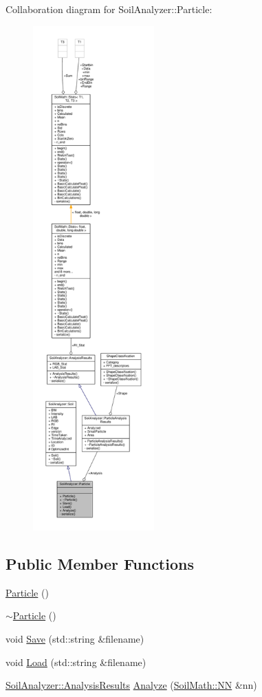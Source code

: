 Collaboration diagram for Soil\+Analyzer\+:\+:Particle\+:\nopagebreak
\begin{figure}[H]
\begin{center}
\leavevmode
\includegraphics[height=550pt]{class_soil_analyzer_1_1_particle__coll__graph}
\end{center}
\end{figure}
\subsection*{Public Member Functions}
\begin{DoxyCompactItemize}
\item 
\hyperlink{class_soil_analyzer_1_1_particle_ac01adbc5a4a30350985c0076da52e7da}{Particle} ()
\item 
\hyperlink{class_soil_analyzer_1_1_particle_ad2a5896d3ddf67275db18971bf43fbfe}{$\sim$\+Particle} ()
\item 
void \hyperlink{class_soil_analyzer_1_1_particle_acf374749108de7599ffca9e065b60447}{Save} (std\+::string \&filename)
\item 
void \hyperlink{class_soil_analyzer_1_1_particle_aed56f2a819047d43895e33bf84e1f6a6}{Load} (std\+::string \&filename)
\item 
\hyperlink{class_soil_analyzer_1_1_analysis_results}{Soil\+Analyzer\+::\+Analysis\+Results} \hyperlink{class_soil_analyzer_1_1_particle_aeb4ed9f49b88f5d6563b993154aabe50}{Analyze} (\hyperlink{class_soil_math_1_1_n_n}{Soil\+Math\+::\+N\+N} \&nn)
\end{DoxyCompactItemize}
